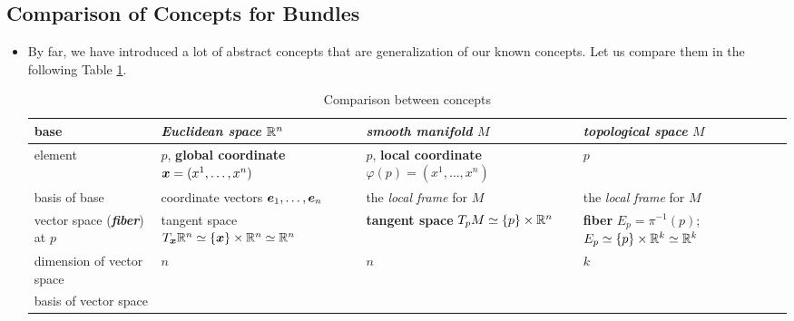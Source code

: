 \documentclass[11pt]{article}
\begin{document}
\subsection{Comparison of Concepts for Bundles}
\begin{itemize}
\item By far, we have introduced a lot of abstract concepts that are generalization of our known concepts. Let us compare them in the following Table \ref{tab: concepts}.
\begin{table}[h!]
\centering
\caption{Comparison between concepts}
\label{tab: concepts}
\renewcommand\tabularxcolumn[1]{m{#1}}
\footnotesize
\begin{tabularx}{1\textwidth} { 
  | >{\raggedright\arraybackslash} m{2cm}
  | >{\centering\arraybackslash}X
  | >{\centering\arraybackslash}X
  | >{\centering\arraybackslash}X  | }
 \hline
 base & \emph{\textbf{Euclidean space}} ${\mathbb R}^{n}$ & \emph{\textbf{smooth manifold}} $M$ & \emph{\textbf{topological space}} $M$  \\
 \hline
 element  & $p$, \textbf{global coordinate} $\boldsymbol{x} = (x^1, \ldots, x^{n})$  & $p$, \textbf{local coordinate} $\varphi(p) = (x^1, \ldots, x^{n})$ & $p$\\
\hline
 basis of base & coordinate vectors
$\boldsymbol{e}_1, \ldots, \boldsymbol{e}_{n}$  & the \emph{local frame} for $M$ & the \emph{local frame} for $M$ \\
\hline
vector space (\emph{\textbf{fiber}}) at $p$ & tangent space $T_{\boldsymbol{x}}{\mathbb R}^{n}  \simeq \left\{\boldsymbol{x}\right\} \times {\mathbb R}^{n} \simeq {\mathbb R}^{n}$ &  \textbf{tangent space}  $T_{p}M \simeq \left\{p\right\} \times {\mathbb R}^{n}$ & \textbf{fiber} $E_{p} = \pi^{-1}(p)$; $E_{p}  \simeq \left\{p\right\} \times {\mathbb R}^{k} \simeq {\mathbb R}^{k}$ \\
\hline
dimension of vector space & $n$ & $n$ & $k$ \\
\hline
basis of vector space &


\end{tabularx}
\end{table}
\end{itemize}
\end{document}
